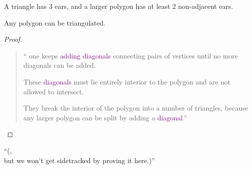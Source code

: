 \begin{frame}{}
  \begin{lemma}
    A triangle has $3$ ears, and a larger  polygon has at least $2$ non-adjacent ears.
  \end{lemma}

  \pause
  \vspace{0.80cm}
  \centerline{}
\end{frame}

\begin{frame}{}
  \begin{theorem}
    Any polygon can be triangulated.
  \end{theorem}

  \pause
  \begin{proof}
    \begin{quote}
      {\large
	`` one keeps \textcolor<6->{purple}{adding diagonals} connecting pairs of vertices 
      until no more diagonals can be added. \\[8pt] \pause

      These \textcolor<6->{purple}{diagonals} must lie entirely interior to the polygon and are not allowed to intersect. \\[8pt] \pause

      They break the interior of the polygon into a number of triangles,
      because any larger polygon can be split by adding a \textcolor<6->{purple}{diagonal}.''
    }
    \end{quote}
  \end{proof}

  \pause
  \begin{center}
    ``(, \\ but we won't get sidetracked by proving it here.)''
  \end{center}
\end{frame}


